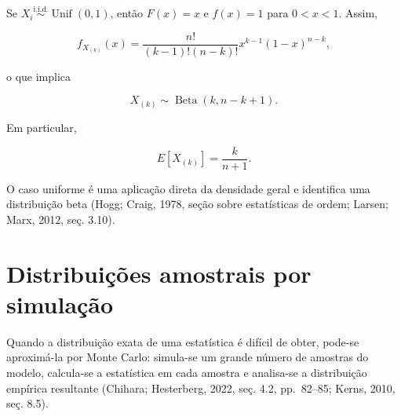 \documentclass[
  letterpaper,
  DIV=11,
  numbers=noendperiod]{scrreprt}
\begin{document}
\begin{tcolorbox}[enhanced jigsaw, colback=white, leftrule=.75mm, colbacktitle=quarto-callout-tip-color!10!white, breakable, titlerule=0mm, bottomtitle=1mm, title=\textcolor{quarto-callout-tip-color}{\faLightbulb}\hspace{0.5em}{Exemplo --- Amostra uniforme}, colframe=quarto-callout-tip-color-frame, toprule=.15mm, opacityback=0, bottomrule=.15mm, opacitybacktitle=0.6, arc=.35mm, toptitle=1mm, rightrule=.15mm, coltitle=black, left=2mm]

Se \(X_i\overset{\mathrm{i.i.d.}}{\sim}\operatorname{Unif}(0,1)\), então
\(F(x)=x\) e \(f(x)=1\) para \(0<x<1\). Assim,

\[f_{X_{(k)}}(x)
=
\frac{n!}{(k-1)!(n-k)!}
 x^{k-1}(1-x)^{n-k},\]

o que implica

\[X_{(k)}\sim\operatorname{Beta}(k,n-k+1).\]

Em particular,

\[E[X_{(k)}]=\frac{k}{n+1}.\]

O caso uniforme é uma aplicação direta da densidade geral e identifica
uma distribuição beta (Hogg; Craig, 1978, seção sobre estatísticas de
ordem; Larsen; Marx, 2012, seç. 3.10).

\end{tcolorbox}

\section{Distribuições amostrais por
simulação}\label{distribuiuxe7uxf5es-amostrais-por-simulauxe7uxe3o}

Quando a distribuição exata de uma estatística é difícil de obter,
pode-se aproximá-la por Monte Carlo: simula-se um grande número de
amostras do modelo, calcula-se a estatística em cada amostra e
analisa-se a distribuição empírica resultante (Chihara; Hesterberg,
2022, seç. 4.2, pp.~82--85; Kerns, 2010, seç. 8.5).
\end{document}
